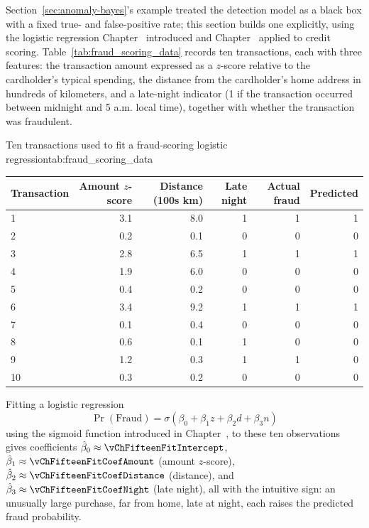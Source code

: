 \documentclass[../ai_in_finance]{subfiles}
\begin{document}
\label{sec:fraud-scoring}

Section~\ref{sec:anomaly-bayes}'s example treated the detection model as a black box with a fixed true- and false-positive rate; this section
builds one explicitly, using the logistic regression Chapter~ introduced and Chapter~ applied to credit scoring.
Table~\ref{tab:fraud_scoring_data} records ten transactions, each with three features: the transaction amount expressed as a $z$-score
relative to the cardholder's typical spending, the distance from the cardholder's home address in hundreds of kilometers, and a late-night
indicator (1 if the transaction occurred between midnight and 5 a.m. local time), together with whether the transaction was fraudulent.

\begin{booktable}[htbp]{Ten transactions used to fit a fraud-scoring logistic regression}{tab:fraud_scoring_data}
\begin{tabular}{lrrrrr}
\toprule
Transaction & Amount $z$-score & Distance (100s km) & Late night & Actual fraud & Predicted \\
\midrule
1 & 3.1 & 8.0 & 1 & 1 & 1 \\
2 & 0.2 & 0.1 & 0 & 0 & 0 \\
3 & 2.8 & 6.5 & 1 & 1 & 1 \\
4 & 1.9 & 6.0 & 0 & 0 & 0 \\
5 & 0.4 & 0.2 & 0 & 0 & 0 \\
6 & 3.4 & 9.2 & 1 & 1 & 1 \\
7 & 0.1 & 0.4 & 0 & 0 & 0 \\
8 & 0.6 & 0.1 & 1 & 0 & 0 \\
9 & 1.2 & 0.3 & 1 & 1 & 0 \\
10 & 0.3 & 0.2 & 0 & 0 & 0 \\
\bottomrule
\end{tabular}
\end{booktable}

Fitting a logistic regression
\begin{equation}
\Pr(\text{Fraud}) = \sigma(\beta_0 + \beta_1 z + \beta_2 d + \beta_3 n)
\label{eq:fraud-logistic}
\end{equation}
using the sigmoid function introduced in Chapter~, to these ten observations gives coefficients $\hat\beta_0 \approx \vChFifteenFitIntercept$, $\hat\beta_1 \approx \vChFifteenFitCoefAmount$ (amount $z$-score), $\hat\beta_2 \approx \vChFifteenFitCoefDistance$ (distance), and $\hat\beta_3 \approx \vChFifteenFitCoefNight$ (late night), all with the intuitive sign: an unusually large purchase, far from home, late at night, each raises the predicted fraud probability.
\end{document}

